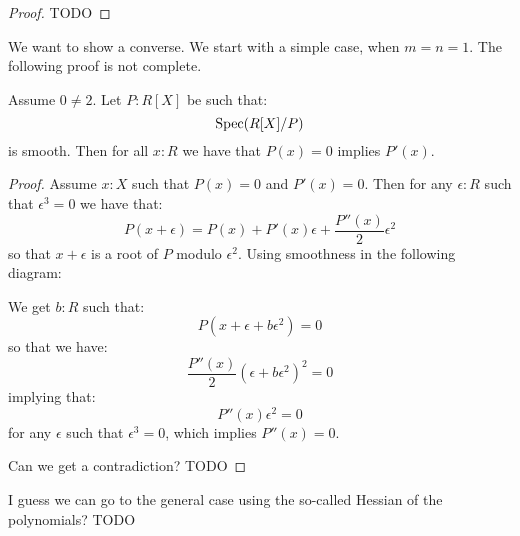 \begin{proof}
TODO
\end{proof}

We want to show a converse. We start with a simple case, when $m=n=1$. The following proof is not complete.

\begin{lemma}
Assume $0\not=2$. Let $P:R[X]$ be such that:
\[\operatorname{Spec}(R[X]/P)\]
is smooth. Then for all $x:R$ we have that $P(x)=0$ implies $P'(x)$.
\end{lemma}

\begin{proof}
Assume $x:X$ such that $P(x) = 0$ and $P'(x)=0$. Then for any $\epsilon:R$ such that $\epsilon^3=0$ we have that:
\[P(x+\epsilon) = P(x) + P'(x)\epsilon + \frac{P''(x)}{2}\epsilon^2 \]
so that $x+\epsilon$ is a root of $P$ modulo $\epsilon^2$. Using smoothness in the following diagram:
 \begin{center}
    \end{center} 
 We get $b:R$ such that:
 \[P(x+\epsilon+b\epsilon^2)=0\]
 so that we have:
 \[ \frac{P''(x)}{2} (\epsilon + b\epsilon^2)^2 = 0\]
 implying that:
 \[ P''(x) \epsilon^2 = 0\]
 for any $\epsilon$ such that $\epsilon^3=0$, which implies $P''(x)=0$.
 
Can we get a contradiction? TODO
\end{proof}

I guess we can go to the general case using the so-called Hessian of the polynomials? TODO


